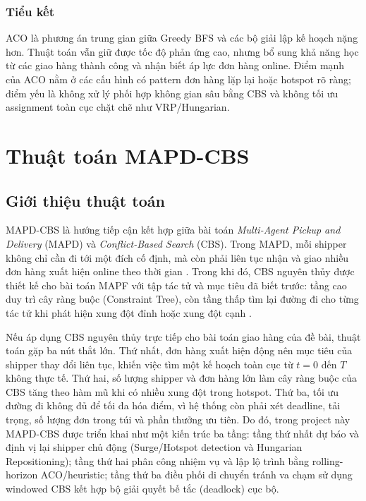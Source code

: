 \documentclass[conference]{IEEEtran}
\begin{document}
\subsubsection{Tiểu kết}
ACO là phương án trung gian giữa Greedy BFS và các bộ giải lập kế hoạch nặng hơn. Thuật toán vẫn giữ được tốc độ phản ứng cao, nhưng bổ sung khả năng học từ các giao hàng thành công và nhận biết áp lực đơn hàng online. Điểm mạnh của ACO nằm ở các cấu hình có pattern đơn hàng lặp lại hoặc hotspot rõ ràng; điểm yếu là không xử lý phối hợp không gian sâu bằng CBS và không tối ưu assignment toàn cục chặt chẽ như VRP/Hungarian.



\section{Thuật toán MAPD-CBS}
\subsection{Giới thiệu thuật toán}
MAPD-CBS là hướng tiếp cận kết hợp giữa bài toán \textit{Multi-Agent Pickup and Delivery} (MAPD) và \textit{Conflict-Based Search} (CBS). Trong MAPD, mỗi shipper không chỉ cần đi tới một đích cố định, mà còn phải liên tục nhận và giao nhiều đơn hàng xuất hiện online theo thời gian \cite{ma2017lifelong}. Trong khi đó, CBS nguyên thủy được thiết kế cho bài toán MAPF với tập tác tử và mục tiêu đã biết trước: tầng cao duy trì cây ràng buộc (Constraint Tree), còn tầng thấp tìm lại đường đi cho từng tác tử khi phát hiện xung đột đỉnh hoặc xung đột cạnh \cite{sharon2015cbs}.

Nếu áp dụng CBS nguyên thủy trực tiếp cho bài toán giao hàng của đề bài, thuật toán gặp ba nút thắt lớn. Thứ nhất, đơn hàng xuất hiện động nên mục tiêu của shipper thay đổi liên tục, khiến việc tìm một kế hoạch toàn cục từ $t=0$ đến $T$ không thực tế. Thứ hai, số lượng shipper và đơn hàng lớn làm cây ràng buộc của CBS tăng theo hàm mũ khi có nhiều xung đột trong hotspot. Thứ ba, tối ưu đường đi không đủ để tối đa hóa điểm, vì hệ thống còn phải xét deadline, tải trọng, số lượng đơn trong túi và phần thưởng ưu tiên. Do đó, trong project này MAPD-CBS được triển khai như một kiến trúc ba tầng: tầng thứ nhất dự báo và định vị lại shipper chủ động (Surge/Hotspot detection và Hungarian Repositioning); tầng thứ hai phân công nhiệm vụ và lập lộ trình bằng rolling-horizon ACO/heuristic; tầng thứ ba điều phối di chuyển tránh va chạm sử dụng windowed CBS kết hợp bộ giải quyết bế tắc (deadlock) cục bộ.
\end{document}
